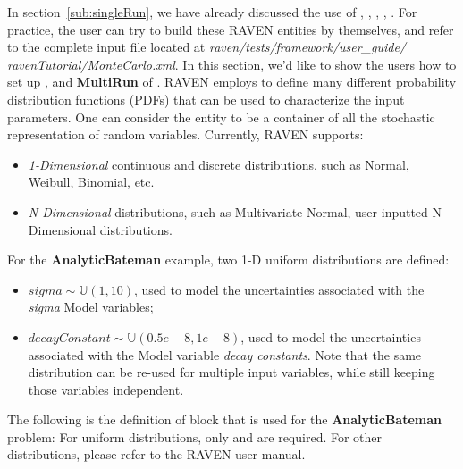 In section~\ref{sub:singleRun}, we have already discussed the use of , , ,
, . For practice, the user can try to build these RAVEN entities by themselves,
and refer to the complete input file located at
\textit{raven/tests/framework/user\_guide/ ravenTutorial/MonteCarlo.xml}.
In this section, we'd like to show the users how to set up ,  and \textbf{MultiRun}
of . RAVEN employs  to define many different probability distribution
functions (PDFs) that can be used to characterize the input parameters. One can consider the 
entity to be a container of all the stochastic representation of random variables. Currently, RAVEN supports:
\begin{itemize}
  \item \textit{1-Dimensional} continuous and discrete distributions, such as Normal, Weibull, Binomial, etc.
  \item \textit{N-Dimensional} distributions, such as Multivariate Normal, user-inputted N-Dimensional distributions.
\end{itemize}
For the \textbf{AnalyticBateman} example, two 1-D uniform distributions are defined:
\begin{itemize}
  \item $sigma \sim \mathbb{U}(1,10)$, used to model the uncertainties associated with the \textit{sigma} Model variables;
  \item $decayConstant \sim \mathbb{U}(0.5e-8,1e-8)$,  used to model the uncertainties associated with the Model variable
    \textit{decay constants}.  Note that the same distribution can be re-used for multiple input variables, while
    still keeping those variables independent.
\end{itemize}
The following is the definition of  block that is used for the \textbf{AnalyticBateman} problem:
For uniform distributions, only  and  are required. For other distributions,
please refer to the RAVEN user manual.


